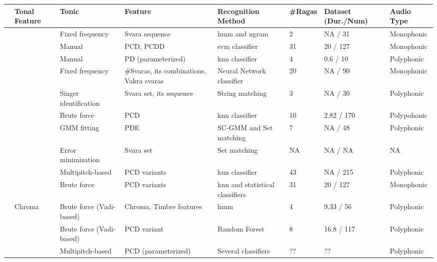 \begin{table}
	\begin{threeparttable} 
\scriptsize
		\begin{centering}
			\begin{tabular}{l l P{2cm} P{3cm} P{2.5cm} L{1cm} P{1.5cm} P{2cm}}
				\hline 
				& \textbf{Tonal Feature} & \textbf{Tonic } & \textbf{Feature} & \textbf{Recognition Method} & \textbf{\#Ragas} & \textbf{Dataset (Dur./Num)} & \textbf{Audio Type}\tabularnewline
				\hline 
				\cite{pandey2003tansen} & \cite{BoersmaPaul2001} & Fixed frequency & Svara sequence & \acrshort{hmm} and \acrshort{ngram} & 2 & NA / 31 & Monophonic\tabularnewline
				\cite{chordia2007raag} & \cite{sun2000pitch} & Manual & PCD, PCDD & \acrshort{svm} classifier & 31 & 20 / 127 & Monophonic\tabularnewline
				\cite{belle2009raga} & \cite{rao2009improving} & Manual & PD (parameterized) & \acrshort{knn} classifier & 4 & 0.6 / 10 & Polyphonic\tabularnewline
				\cite{Shetty2009} & \cite{sridhar_2006_svara} & Fixed frequency & \#Svaras, its combinations, Vakra svaras & Neural Network classifier & 20 & NA / 90 & Monophonic\tabularnewline
				\cite{sridhar2009raga} & \cite{lee2006automatic} & Singer identification & Svara set, its sequence & String matching & 3 & NA / 30 & Polyphonic\tabularnewline
				\cite{koduri2011survey} & \cite{rao2010vocal} & Brute force & PCD & \acrshort{knn} classifier & 10 & 2.82 / 170 & Polypohonic\tabularnewline
				\cite{ranjani2011carnatic} & \cite{BoersmaPaul2001} & GMM fitting & PDE & SC-GMM and Set matching & 7 & NA / 48 & Polyphonic\tabularnewline
				\cite{chakraborty2012object} & \cite{sengupta1990study} & Error minimization & Svara set & Set matching & NA & NA / NA & NA\tabularnewline
				\cite{koduri2012raga} & \cite{Salamon2012} & Multipitch-based & PCD variants & \acrshort{knn} classifier & 43 & NA / 215 & Polyphonic\tabularnewline
				\cite{chordia2013joint} & \cite{camacho2007swipe} & Brute force & PCD variants & \acrshort{knn} and statistical classifiers & 31 & 20 / 127 & Monophonic\tabularnewline
				\cite{dighe2013scale} & Chroma~\citep{lartillot2008matlab} & Brute force (Vadi-based) & Chroma, Timbre features & \acrshort{hmm}  & 4 & 9.33 / 56 & Polyphonic\tabularnewline
				\cite{dighe2013swara} & \citep{lartillot2008matlab} & Brute force (Vadi-based) & PCD variant & Random Forest & 8 & 16.8 / 117 & Polyphonic\tabularnewline
				\cite{koduri2014intonation} & \cite{Salamon2012} & Multipitch-based & PCD (parameterized)  & Several classifiers & ?? & ?? & Polyphonic\tabularnewline

\end{tabular}
\end{centering}
\end{threeparttable}
\end{table}
